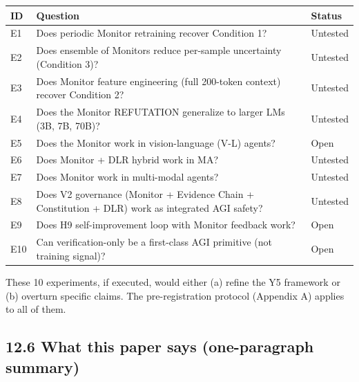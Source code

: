 \documentclass[
]{article}
\newcounter{none} %
\begin{document}
{\def\LTcaptype{none} %
\begin{longtable}[]{@{}
  >{\raggedright\arraybackslash}p{}
  >{\raggedright\arraybackslash}p{}
  >{\raggedright\arraybackslash}p{}@{}}
\toprule\noalign{}
\begin{minipage}[b]{\linewidth}\raggedright
ID
\end{minipage} & \begin{minipage}[b]{\linewidth}\raggedright
Question
\end{minipage} & \begin{minipage}[b]{\linewidth}\raggedright
Status
\end{minipage} \\
\midrule\noalign{}
\endhead
\bottomrule\noalign{}
\endlastfoot
E1 & Does periodic Monitor retraining recover Condition 1? & Untested \\
E2 & Does ensemble of Monitors reduce per-sample uncertainty (Condition
3)? & Untested \\
E3 & Does Monitor feature engineering (full 200-token context) recover
Condition 2? & Untested \\
E4 & Does the Monitor REFUTATION generalize to larger LMs (3B, 7B, 70B)?
& Untested \\
E5 & Does the Monitor work in vision-language (V-L) agents? & Open \\
E6 & Does Monitor + DLR hybrid work in MA? & Untested \\
E7 & Does Monitor work in multi-modal agents? & Untested \\
E8 & Does V2 governance (Monitor + Evidence Chain + Constitution + DLR)
work as integrated AGI safety? & Untested \\
E9 & Does H9 self-improvement loop with Monitor feedback work? & Open \\
E10 & Can verification-only be a first-class AGI primitive (not training
signal)? & Open \\
\end{longtable}
}

These 10 experiments, if executed, would either (a) refine the Y5
framework or (b) overturn specific claims. The pre-registration protocol
(Appendix A) applies to all of them.

\subsection{12.6 What this paper says (one-paragraph
summary)}\label{what-this-paper-says-one-paragraph-summary}
\end{document}

